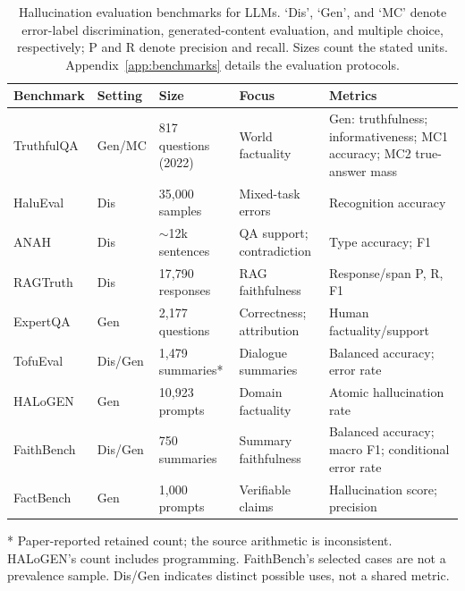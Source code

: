 \begin{table}[t]
\centering\small
\setlength{\tabcolsep}{3pt}
\renewcommand{\arraystretch}{1.12}
\begin{tabularx}{\textwidth}{@{}p{}p{}p{}p{}X@{}}
\toprule
Benchmark & Setting & Size & Focus & Metrics \\
\midrule
TruthfulQA \citep{lin-etal-2022-truthfulqa} & Gen/MC & 817 questions (2022) & World factuality & Gen: truthfulness; informativeness; MC1 accuracy; MC2 true-answer mass \\
HaluEval \citep{li-etal-2023-halueval} & Dis & 35,000 samples & Mixed-task errors & Recognition accuracy \\
ANAH \citep{ji-etal-2024-anah} & Dis & $\sim$12k sentences & QA support; contradiction & Type accuracy; F1 \\
RAGTruth \citep{niu-etal-2024-ragtruth} & Dis & 17,790 responses & RAG faithfulness & Response/span P, R, F1 \\
ExpertQA \citep{malaviya-etal-2024-expertqa} & Gen & 2,177 questions & Correctness; attribution & Human factuality/support \\
TofuEval \citep{tang-etal-2024-tofueval} & Dis/Gen & 1,479 summaries* & Dialogue summaries & Balanced accuracy; error rate \\
HALoGEN \citep{ravichander-etal-2025-halogen} & Gen & 10,923 prompts & Domain factuality & Atomic hallucination rate \\
FaithBench \citep{bao-etal-2025-faithbench} & Dis/Gen & 750 summaries & Summary faithfulness & Balanced accuracy; macro F1; conditional error rate \\
FactBench \citep{fatahi-bayat-etal-2025-factbench} & Gen & 1,000 prompts & Verifiable claims & Hallucination score; precision \\
\bottomrule
\end{tabularx}
\par\smallskip\begin{minipage}{\textwidth}\footnotesize
* Paper-reported retained count; the source arithmetic is inconsistent. HALoGEN's count includes programming. FaithBench's selected cases are not a prevalence sample. Dis/Gen indicates distinct possible uses, not a shared metric.
\end{minipage}
\caption{Hallucination evaluation benchmarks for LLMs. `Dis', `Gen', and `MC' denote error-label discrimination, generated-content evaluation, and multiple choice, respectively; P and R denote precision and recall. Sizes count the stated units. Appendix~\ref{app:benchmarks} details the evaluation protocols.}
\label{tab:hallucination-benchmarks}
\end{table}
